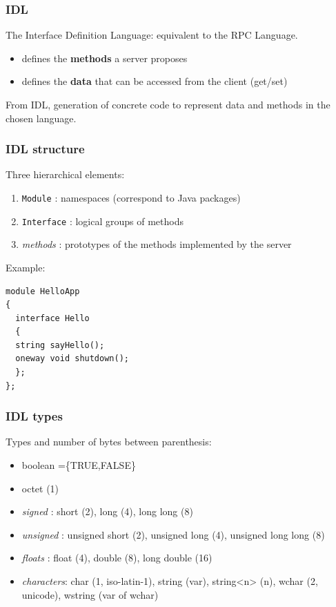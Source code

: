 \documentclass[bigger,hyperref={colorlinks=true, urlcolor=red, plainpages=false, pdfpagelabels, bookmarksnumbered}]{beamer}
\begin{document}
\begin{frame}
\frametitle{IDL}
\label{sec-4-3}


   The Interface Definition Language:
   equivalent to the RPC Language.

\begin{itemize}
\item defines the \textbf{methods} a server proposes
\item defines the \textbf{data} that can be accessed from the client (get/set)
\end{itemize}

   From IDL, generation of concrete code to
   represent data and methods in the chosen language.
 
\end{frame}
\begin{frame}[fragile]
\frametitle{IDL structure}
\label{sec-4-4}


Three hierarchical elements:
\begin{enumerate}
\item \texttt{Module} : namespaces (correspond to Java packages)
\item \texttt{Interface} : logical groups of methods
\item \emph{methods} : prototypes of the methods implemented by the server
\end{enumerate}

Example:

\lstset{language=idl}
\begin{lstlisting}
module HelloApp
{
  interface Hello
  {
  string sayHello();
  oneway void shutdown();
  };
};
\end{lstlisting}
\end{frame}
\begin{frame}
\frametitle{IDL types}
\label{sec-4-5}

Types and number of bytes between parenthesis: 
\begin{itemize}
\item boolean =\{TRUE,FALSE\}
\item octet (1)
\item \emph{signed} : short (2), long (4), long long (8)
\item \emph{unsigned} : unsigned short (2), unsigned long (4), unsigned long long (8)
\item \emph{floats} : float (4), double (8), long double (16)
\item \emph{characters}: char (1, iso-latin-1), string (var), string<n> (n), wchar (2, unicode), wstring (var of wchar)
\end{itemize}
\end{frame}
\end{document}
